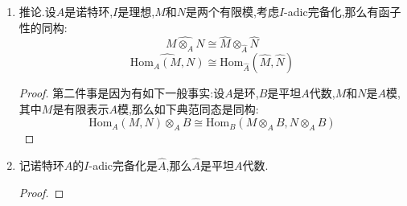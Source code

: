 \begin{enumerate}
\begin{enumerate}[(1)]
\begin{proof}
    		取$M$的一个有限表示$A^p\to A^q\to M\to0$.按照上一条的正合性,得到完备化和有限直和可交换,并且有正合列$\widehat{A}^p\to\widehat{A}^q\to\widehat{M}\to0$.考虑如下交换图,它的两行都是正合列,于是短五引理说明前两个垂直映射是同构推出第三个垂直映射是同构,完成证明.
    		$$\xymatrix{\widehat{A}^p\ar[r]&\widehat{A}^q\ar[r]&\widehat{M}\ar[r]&0\\A^p\otimes_A\widehat{A}\ar[r]\ar[u]_{\cong}&A^q\otimes_A\widehat{A}\ar[r]\ar[u]_{\cong}&M\otimes_A\widehat{A}\ar[r]\ar[u]&0}$$
    	\end{proof}
        \item 推论.设$A$是诺特环,$I$是理想,$M$和$N$是两个有限模,考虑$I$-adic完备化,那么有函子性的同构:
        $$\widehat{M\otimes_AN}\cong\widehat{M}\otimes_{\widehat{A}}\widehat{N}$$
        $$\widehat{\mathrm{Hom}_A(M,N)}\cong\mathrm{Hom}_{\widehat{A}}(\widehat{M},\widehat{N})$$
        \begin{proof}
        	
        	第二件事是因为有如下一般事实:设$A$是环,$B$是平坦$A$代数,$M$和$N$是$A$模,其中$M$是有限表示$A$模,那么如下典范同态是同构:
        	$$\mathrm{Hom}_A(M,N)\otimes_AB\cong\mathrm{Hom}_B(M\otimes_AB,N\otimes_AB)$$
        \end{proof}
    	\item 记诺特环$A$的$I$-adic完备化是$\widehat{A}$,那么$\widehat{A}$是平坦$A$代数.
    	\begin{proof}
    		

\end{proof}
\end{enumerate}
\end{enumerate}

